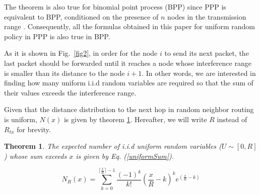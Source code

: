 \documentclass[12pt, draftclsnofoot, onecolumn]{IEEEtran}
\newtheorem{theorem}{Theorem}[section]
\begin{document}
The theorem is also true for binomial point process (BPP) since PPP is 
equivalent to BPP, conditioned on the presence of $n$ nodes in the 
transmission range \cite{srinivasa2010distance}. Consequently, all the 
formulas obtained in this paper for uniform random policy in PPP is also 
true in BPP.

As it is shown in Fig.~\ref{fig2}, in order for the node $i$ to send its next 
packet, the last packet should be forwarded until it reaches a node whose 
interference range is smaller than its distance to the node $i+1$. 
In other words, we are interested in finding how many uniform i.i.d random 
variables are required so that the sum of their values exceeds the interference range.

Given that the distance distribution to the next hop in random neighbor 
routing is uniform, $N(x)$ is given by theorem \ref{RV}. Hereafter, we will write 
$R$ instead of $R_{tx}$ for brevity.

\begin{theorem}
\label{RV}
The expected number of i.i.d uniform random variables ($U{\sim}[0,R]$) 
whose sum exceeds $x$ is given by Eq. (\ref{uniformSum}).

\begin{equation}
\label{uniformSum}
N_R(x)= \sum_{k=0}^{\lceil \frac{x}{R} \rceil - 1} \frac{(-1)^k}{k!} (\frac{x}{R}-k)^k e^{(\frac{x}{R}-k)}
\end{equation}

\end{theorem}
\end{document}
